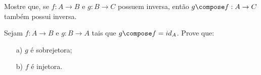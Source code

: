 \begin{exercise}
Mostre que, se $f : A \to B$ e $g : B \to C$ possuem inversa, então $g \compose f : A \to C$ também possui inversa.
\end{exercise}

\begin{exercise}
Sejam $f : A \to B$ e $g : B \to A$ tais que $g \compose f = id_A$.
Prove que:
	\begin{enumerate}
		\item[a)] $g$ é sobrejetora; 
		\item[b)] $f$ é injetora.
	\end{enumerate}
\end{exercise}
